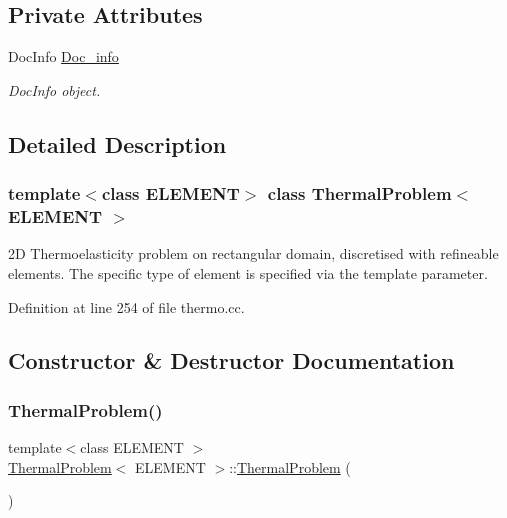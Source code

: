 \subsection*{Private Attributes}
\begin{DoxyCompactItemize}
\item 
Doc\+Info \hyperlink{classThermalProblem_ae03e6df96a793f3735d1674e4e8a6cb3}{Doc\+\_\+info}
\begin{DoxyCompactList}\small\item\em Doc\+Info object. \end{DoxyCompactList}\end{DoxyCompactItemize}


\subsection{Detailed Description}
\subsubsection*{template$<$class E\+L\+E\+M\+E\+NT$>$\newline
class Thermal\+Problem$<$ E\+L\+E\+M\+E\+N\+T $>$}

2D Thermoelasticity problem on rectangular domain, discretised with refineable elements. The specific type of element is specified via the template parameter. 

Definition at line 254 of file thermo.\+cc.



\subsection{Constructor \& Destructor Documentation}
\mbox{\label{classThermalProblem_a12ad5d383929b1ef4ed29503c5a271b0}} 
\subsubsection{\texorpdfstring{Thermal\+Problem()}{ThermalProblem()}}
{\footnotesize\ttfamily template$<$class E\+L\+E\+M\+E\+NT $>$ \\
\hyperlink{classThermalProblem}{Thermal\+Problem}$<$ E\+L\+E\+M\+E\+NT $>$\+::\hyperlink{classThermalProblem}{Thermal\+Problem} (\begin{DoxyParamCaption}{ }\end{DoxyParamCaption})}



